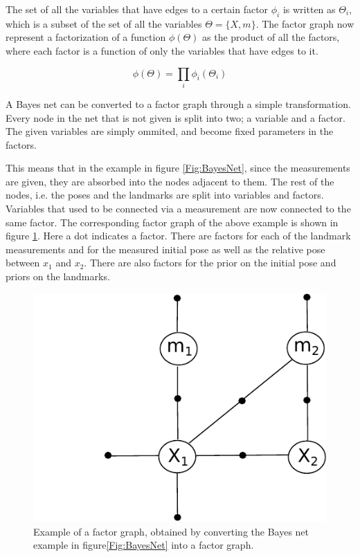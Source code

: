 The set of all the variables that have edges to a certain factor $\phi_i$ is written as $\Theta_i$, which is a subset of the set of all the variables $\Theta = \{X,m\}$. The factor graph now represent a factorization of a function $\phi(\Theta)$ as the product of all the factors, where each factor is a function of only the variables that have edges to it.

\begin{equation}
    \phi(\Theta) = \prod_i \phi_i(\Theta_i)
\end{equation}

A Bayes net can be converted to a factor graph through a simple transformation. Every node in the net that is not given is split into two; a variable and a factor. The given variables are simply ommited, and become fixed parameters in the factors. 

This means that in the example in figure \ref{Fig:BayesNet}, since the measurements are given, they are absorbed into the nodes adjacent to them. The rest of the nodes, i.e. the poses and the landmarks are split into variables and factors. Variables that used to be connected via a measurement are now connected to the same factor. The corresponding factor graph of the above example is shown in figure \ref{Fig:FactorGraph}. Here a dot indicates a factor. There are factors for each of the landmark measurements and for the measured initial pose as well as the relative pose between $x_1$ and $x_2$. There are also factors for the prior on the initial pose and priors on the landmarks.

\begin{figure}
    \centering
    \includegraphics[width=0.8\linewidth]{0_Images/3_Background/FactorGraph.pdf}
    \caption[Example of a Bayes net.]
    {Example of a factor graph, obtained by converting the Bayes net example in figure\ref{Fig:BayesNet} into a factor graph.}
    \label{Fig:FactorGraph}
\end{figure}

